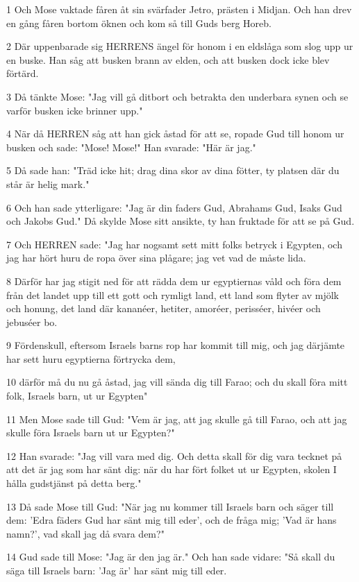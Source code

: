 \par 1 Och Mose vaktade fåren åt sin svärfader Jetro, prästen i Midjan. Och han drev en gång fåren bortom öknen och kom så till Guds berg Horeb.
\par 2 Där uppenbarade sig HERRENS ängel för honom i en eldslåga som slog upp ur en buske. Han såg att busken brann av elden, och att busken dock icke blev förtärd.
\par 3 Då tänkte Mose: "Jag vill gå ditbort och betrakta den underbara synen och se varför busken icke brinner upp."
\par 4 När då HERREN såg att han gick åstad för att se, ropade Gud till honom ur busken och sade: "Mose! Mose!" Han svarade: "Här är jag."
\par 5 Då sade han: "Träd icke hit; drag dina skor av dina fötter, ty platsen där du står är helig mark."
\par 6 Och han sade ytterligare: "Jag är din faders Gud, Abrahams Gud, Isaks Gud och Jakobs Gud." Då skylde Mose sitt ansikte, ty han fruktade för att se på Gud.
\par 7 Och HERREN sade: "Jag har nogsamt sett mitt folks betryck i Egypten, och jag har hört huru de ropa över sina plågare; jag vet vad de måste lida.
\par 8 Därför har jag stigit ned för att rädda dem ur egyptiernas våld och föra dem från det landet upp till ett gott och rymligt land, ett land som flyter av mjölk och honung, det land där kananéer, hetiter, amoréer, perisséer, hivéer och jebuséer bo.
\par 9 Fördenskull, eftersom Israels barns rop har kommit till mig, och jag därjämte har sett huru egyptierna förtrycka dem,
\par 10 därför må du nu gå åstad, jag vill sända dig till Farao; och du skall föra mitt folk, Israels barn, ut ur Egypten"
\par 11 Men Mose sade till Gud: "Vem är jag, att jag skulle gå till Farao, och att jag skulle föra Israels barn ut ur Egypten?"
\par 12 Han svarade: "Jag vill vara med dig. Och detta skall för dig vara tecknet på att det är jag som har sänt dig: när du har fört folket ut ur Egypten, skolen I hålla gudstjänst på detta berg."
\par 13 Då sade Mose till Gud: "När jag nu kommer till Israels barn och säger till dem: 'Edra fäders Gud har sänt mig till eder', och de fråga mig; 'Vad är hans namn?', vad skall jag då svara dem?"
\par 14 Gud sade till Mose: "Jag är den jag är." Och han sade vidare: "Så skall du säga till Israels barn: 'Jag är' har sänt mig till eder.
